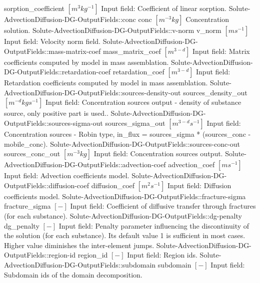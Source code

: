 \begin{SelectionType}
			{sorption{\_}coefficient}
			{{{}{$[m^{3}kg^{-1}]$}{ Input field: Coefficient of linear sorption.}%
}}
		\SelectionItem
			{Solute-AdvectionDiffusion-DG-OutputFields::conc}
			{conc}
			{{{}{$[m^{-3}kg]$}{ Concentration solution.}%
}}
		\SelectionItem
			{Solute-AdvectionDiffusion-DG-OutputFields::v-norm}
			{v{\_}norm}
			{{{}{$[ms^{-1}]$}{ Input field: Velocity norm field.}%
}}
		\SelectionItem
			{Solute-AdvectionDiffusion-DG-OutputFields::mass-matrix-coef}
			{mass{\_}matrix{\_}coef}
			{{{}{$[m^{3-d}]$}{ Input field: Matrix coefficients computed by model in mass assemblation.}%
}}
		\SelectionItem
			{Solute-AdvectionDiffusion-DG-OutputFields::retardation-coef}
			{retardation{\_}coef}
			{{{}{$[m^{3-d}]$}{ Input field: Retardation coefficients computed by model in mass assemblation.}%
}}
		\SelectionItem
			{Solute-AdvectionDiffusion-DG-OutputFields::sources-density-out}
			{sources{\_}density{\_}out}
			{{{}{$[m^{-d}kgs^{-1}]$}{ Input field: Concentration sources output - density of substance source, only positive part is used..}%
}}
		\SelectionItem
			{Solute-AdvectionDiffusion-DG-OutputFields::sources-sigma-out}
			{sources{\_}sigma{\_}out}
			{{{}{$[m^{3-d}s^{-1}]$}{ Input field: Concentration sources - Robin type, in{\_}flux = sources{\_}sigma * (sources{\_}conc - mobile{\_}conc).}%
}}
		\SelectionItem
			{Solute-AdvectionDiffusion-DG-OutputFields::sources-conc-out}
			{sources{\_}conc{\_}out}
			{{{}{$[m^{-3}kg]$}{ Input field: Concentration sources output.}%
}}
		\SelectionItem
			{Solute-AdvectionDiffusion-DG-OutputFields::advection-coef}
			{advection{\_}coef}
			{{{}{$[ms^{-1}]$}{ Input field: Advection coefficients model.}%
}}
		\SelectionItem
			{Solute-AdvectionDiffusion-DG-OutputFields::diffusion-coef}
			{diffusion{\_}coef}
			{{{}{$[m^{2}s^{-1}]$}{ Input field: Diffusion coefficients model.}%
}}
		\SelectionItem
			{Solute-AdvectionDiffusion-DG-OutputFields::fracture-sigma}
			{fracture{\_}sigma}
			{{{}{$[-]$}{ Input field: Coefficient of diffusive transfer through fractures (for each substance).}%
}}
		\SelectionItem
			{Solute-AdvectionDiffusion-DG-OutputFields::dg-penalty}
			{dg{\_}penalty}
			{{{}{$[-]$}{ Input field: Penalty parameter influencing the discontinuity of the solution (for each substance). Its default value 1 is sufficient in most cases.
Higher value diminishes the inter-element jumps.}%
}}
		\SelectionItem
			{Solute-AdvectionDiffusion-DG-OutputFields::region-id}
			{region{\_}id}
			{{{}{$[-]$}{ Input field: Region ids.}%
}}
		\SelectionItem
			{Solute-AdvectionDiffusion-DG-OutputFields::subdomain}
			{subdomain}
			{{{}{$[-]$}{ Input field: Subdomain ids of the domain decomposition.}%
}}
\end{SelectionType}
